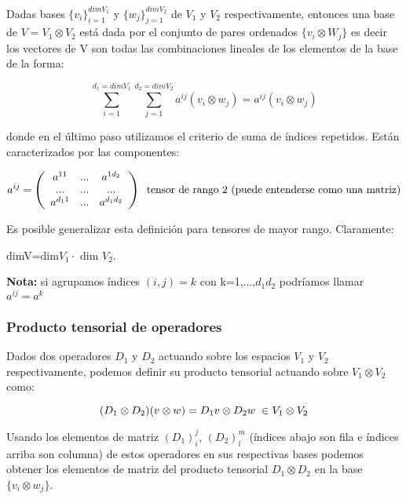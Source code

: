 \documentclass{article}
\begin{document}
    Dadas bases $\lbrace v_i\rbrace _{i=1}^{dim V_1}$ y $\lbrace w_j\rbrace _{j=1}^{dim V_2}$ de $V_1$ y $V_2$ respectivamente, entonces una base de $V=V_1 \otimes V_2$ está dada por el conjunto de pares ordenados $\lbrace v_i \otimes W_j \rbrace$ es decir los vectores de V son todas las combinaciones lineales de los elementos de la base de la forma:
    
    $$\sum _{i=1}^{d_1=dim V_1}\sum _{j=1}^{d_2=dimV_2} a^{ij}(v_i\otimes w_j)=a^{ij}(v_i \otimes w_j)$$
    
    donde en el último paso utilizamos el criterio de suma de índices repetidos. Están caracterizados por las componentes:
    
    $$a^{ij}=\left ( \begin{array}{ccc}
        a^{11} & ... & a^{1d_2} \\
        ... & ... & ... \\
        a^{d_11} & ... & a^{d_1d_2}
    \end{array}\right) \hspace{0.2cm} \text{tensor de rango 2 (puede entenderse como una matriz)}$$
    
    \smallskip
    
    Es posible generalizar esta definición para tensores de mayor rango. Claramente:
    \begin{center}
    dimV=dim$V_1 \cdot $ dim $V_2$.
    
    \end{center}
    
    \textbf{Nota:} si agrupamos índices $(i,j)=k$ con k=1,...,$d_1d_2$ podríamos llamar $a^{ij}=a^k$
    
    \subsubsection{Producto tensorial de operadores}
    
    Dados dos operadores $D_1$ y $D_2$ actuando sobre los espacios $V_1$ y $V_2$ respectivamente, podemos definir su producto tensorial actuando sobre $V_1 \otimes V_2$ como:
    
    $$(D_1\otimes D_2)(v\otimes w)=D_1v \otimes D_2w  \hspace{0.1cm} \in V_1 \otimes V_2$$

Usando los elementos de matriz $(D_1)^j_i$, $(D_2)^m_l$ (índices abajo son fila e índices arriba son columna) de estos operadores en sus respectivas bases podemos obtener los elementos de matriz del producto tensorial $D_1 \otimes D_2$ en la base $\lbrace v_i\otimes w_j \rbrace$.
\end{document}
